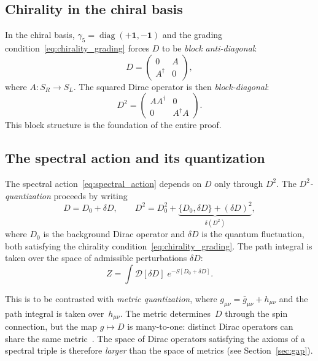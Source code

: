 \documentclass[12pt,a4paper]{article}
\theoremstyle{definition}
\theoremstyle{remark}
\begin{document}
\subsection{Chirality in the chiral basis}

In the chiral basis, $\gamma_5 = \operatorname{diag}(+\mathbf{1}, -\mathbf{1})$
and the grading condition~\eqref{eq:chirality_grading} forces $D$ to be
\emph{block anti-diagonal}:
\begin{equation}\label{eq:D_chiral_basis}
  D = \begin{pmatrix} 0 & A \\ A^\dagger & 0 \end{pmatrix},
\end{equation}
where $A\colon S_R \to S_L$.  The squared Dirac operator is then
\emph{block-diagonal}:
\begin{equation}\label{eq:D2_chiral_basis}
  D^2 = \begin{pmatrix} AA^\dagger & 0 \\ 0 & A^\dagger A \end{pmatrix}.
\end{equation}
This block structure is the foundation of the entire proof.

\subsection{The spectral action and its quantization}

The spectral action~\eqref{eq:spectral_action} depends on $D$ only through
$D^2$.  The \emph{$D^2$-quantization} proceeds by writing
\begin{equation}\label{eq:D2_quantization}
  D = D_0 + \delta D, \qquad
  D^2 = D_0^2 + \underbrace{\{D_0, \delta D\} + (\delta D)^2}_{\delta(D^2)},
\end{equation}
where $D_0$ is the background Dirac operator and $\delta D$ is the quantum
fluctuation, both satisfying the chirality condition~\eqref{eq:chirality_grading}.
The path integral is taken over the space of admissible perturbations $\delta D$:
\begin{equation}\label{eq:path_integral}
  Z = \int \mathcal{D}[\delta D]\; e^{-S[D_0 + \delta D]}.
\end{equation}

This is to be contrasted with \emph{metric quantization}, where
$g_{\mu\nu} = \bar{g}_{\mu\nu} + h_{\mu\nu}$ and the path integral is taken
over~$h_{\mu\nu}$.  The metric determines~$D$ through the spin connection, but
the map $g \mapsto D$ is many-to-one: distinct Dirac operators can share the
same metric~\cite{Barrett:2015matrix}.  The space of Dirac operators satisfying
the axioms of a spectral triple is therefore \emph{larger} than the space of
metrics (see Section~\ref{sec:gap}).
\end{document}
